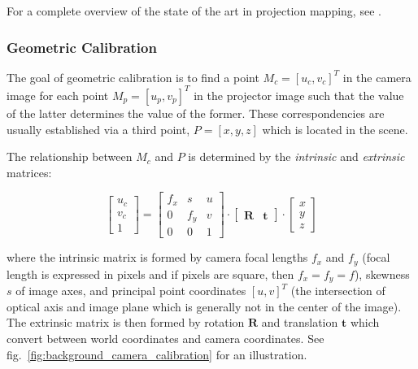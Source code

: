 For a complete overview of the state of the art in projection mapping, see \citet{Grundhofer2018}.

\subsubsection{Geometric Calibration}
\label{section:background-projection_mapping-procams-geometric_calibration}

The goal of geometric calibration is to find a point \(M_c = [u_c, v_c]^T\) in the camera image for each point \(M_p = [u_p, v_p]^T\) in the projector image such that the value of the latter determines the value of the former. These correspondencies are usually established via a third point, \(P = [x, y, z]\) which is located in the scene.

The relationship between \(M_c\) and \(P\) is determined by the \textit{intrinsic} and \textit{extrinsic} matrices:

\begin{equation}
    \label{eq:camera_equation}
    \begin{bmatrix}
        u_c \\
        v_c \\
        1
    \end{bmatrix} =
    \begin{bmatrix}
        f_x & s & u \\
        0 & f_y & v \\
        0 & 0 & 1 
    \end{bmatrix} \cdot
    \begin{bmatrix}
        \bm{R} & \bm{t}
    \end{bmatrix} \cdot
    \begin{bmatrix}
        x \\
        y \\
        z
    \end{bmatrix}
\end{equation}

where the intrinsic matrix is formed by camera focal lengths \(f_x\) and \(f_y\) (focal length is expressed in pixels and if pixels are square, then \(f_x = f_y = f\)), skewness \(s\) of image axes, and principal point coordinates \([u, v]^T\) (the intersection of optical axis and image plane which is generally not in the center of the image). The extrinsic matrix is then formed by rotation \(\bm{R}\) and translation \(\bm{t}\) which convert between world coordinates and camera coordinates. See fig.~\ref{fig:background_camera_calibration} for an illustration.

